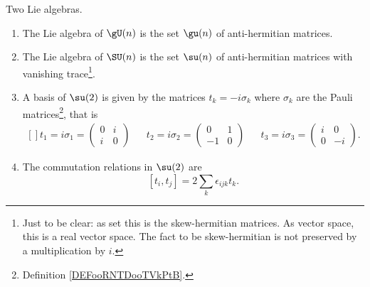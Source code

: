 \begin{proposition}     \label{PROPooHOOLooOrcquD}
    Two Lie algebras.
    \begin{enumerate}
        \item       \label{ITEMooFSTMooGSjovL}
    The Lie algebra of \( \gU(n)\) is the set \( \gu(n)\) of anti-hermitian matrices.
\item       \label{ITEMooYEFMooRmGmlF}
    The Lie algebra of \( \SU(n)\) is the set \( \su(n)\) of anti-hermitian matrices with vanishing trace\footnote{Just to be clear: as set this is the skew-hermitian matrices. As vector space, this is a real vector space. The fact to be skew-hermitian is not preserved by a multiplication by \( i\).}.
\item           \label{ITEMooXXTRooQZzCfs}
    A basis of \( \su(2)\) is given by the matrices \( t_k=-i\sigma_k\) where \( \sigma_k\) are the Pauli matrices\footnote{Definition \ref{DEFooRNTDooTVkPtB}.}, that is
    \begin{equation}
        \begin{aligned}[]
            t_1=i\sigma_1=\begin{pmatrix}
                0    &   i    \\ 
                i    &   0    
            \end{pmatrix}&&t_2=i\sigma_2=\begin{pmatrix}
                0    &   1    \\ 
                -1    &   0    
            \end{pmatrix}&&t_3=i\sigma_3=\begin{pmatrix}
                i    &   0    \\ 
                0    &   -i    
            \end{pmatrix}.
        \end{aligned}
    \end{equation}
\item
    The commutation relations in \( \su(2)\) are
    \begin{equation}        \label{EQooFJIDooRtQGjA}
        [t_i,t_j]=2\sum_k\epsilon_{ijk}t_k.
    \end{equation}
    \end{enumerate}
\end{proposition}

